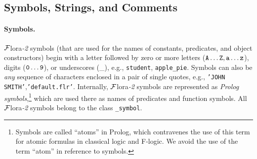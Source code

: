 \documentclass[11pt]{article}
\newcommand{\FLORA}{{\mbox{\sc ${\cal F}${lora}\rm\emph{-2}}}\xspace}
\newcommand{\fl}{\mbox{F-logic}\xspace}
\begin{document}
\subsection{Symbols, Strings, and Comments}\label{sec-symbols}


\paragraph{Symbols.}
\FLORA symbols (that are used for the names of constants, predicates, and
object constructors) begin with a letter followed by zero or more
letters ($\tt A \ldots Z, a \ldots z$), digits ($\tt 0 \ldots 9$), or underscores
(\_), e.g., \texttt{student}, \texttt{apple\_pie}. Symbols can also be
\emph{any} sequence of characters enclosed in a pair of single quotes,
e.g., \texttt{'JOHN SMITH'},\texttt{'default.flr'}.  Internally, \FLORA
symbols are represented as \emph{Prolog symbols},\footnote{
  Symbols are called ``atoms'' in Prolog, which contravenes the use of this
  term for atomic formulas in classical logic and \fl.
  We avoid the use of the term ``atom'' in reference to symbols.
  }
which are used there as names of predicates and function symbols.
All \FLORA symbols belong to the class {\tt \_symbol}.
\end{document}
